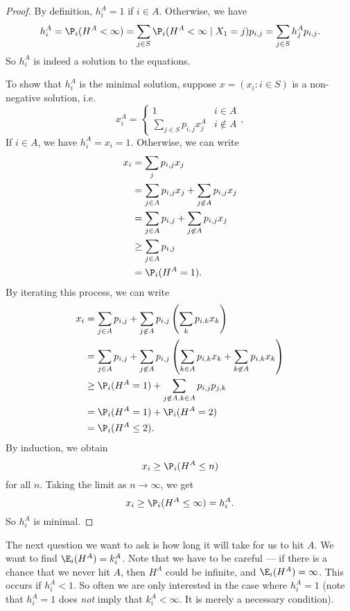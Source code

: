 \documentclass[a4paper]{article}
\begin{document}
\begin{proof}
  By definition, $h_i^A = 1$ if $i \in A$. Otherwise, we have
  \[
    h_i^A = \P_i(H^A < \infty) = \sum_{j\in S} \P_i(H^A < \infty \mid X_1 = j)p_{i, j} = \sum_{j\in S}h_{j}^A p_{i, j}.
  \]
  So $h_i^A$ is indeed a solution to the equations.

  To show that $h_i^A$ is the minimal solution, suppose $x = (x_i: i \in S)$ is a non-negative solution, i.e.
  \[
    x_i^A =
    \begin{cases}
      1 & i \in A\\
      \sum_{j \in S}p_{i, j}x_j^A & i \not \in A
    \end{cases},
  \]
  If $i \in A$, we have $h_i^A = x_i = 1$. Otherwise, we can write
  \begin{align*}
    x_i &= \sum_j p_{i, j}x_j \\
    &= \sum_{j \in A}p_{i, j}x_j + \sum_{j \not\in A}p_{i, j}x_j \\
    &= \sum_{j \in A}p_{i, j} + \sum_{j \not\in A}p_{i, j}x_j \\
    &\geq \sum_{j \in A}p_{i, j}\\
    &= \P_i(H^A = 1).
  \end{align*}
  By iterating this process, we can write
  \begin{align*}
    x_i &= \sum_{j \in A} p_{i, j} + \sum_{j \not\in A} p_{i, j}\left(\sum_k p_{i, k} x_k\right) \\
    &= \sum_{j \in A} p_{i, j} + \sum_{j \not\in A} p_{i, j}\left(\sum_{k\in A} p_{i, k} x_k + \sum_{k \not\in A} p_{i, k}x_k\right)\\
    &\geq \P_i (H^A = 1) + \sum_{j \not \in A, k \in A}p_{i, j}p_{j, k}\\
    &= \P_i(H^A = 1) + \P_i(H^A = 2)\\
    &= \P_i (H^A \leq 2).
  \end{align*}
  By induction, we obtain
  \[
    x_i \geq \P_i(H^A \leq n)
  \]
  for all $n$. Taking the limit as $n \to \infty$, we get
  \[
    x_i \geq \P_i(H^A \leq \infty) = h_i^A.
  \]
  So $h_i^A$ is minimal.
\end{proof}
The next question we want to ask is how long it will take for us to hit $A$. We want to find $\E_i(H^A) = k_i^A$. Note that we have to be careful --- if there is a chance that we never hit $A$, then $H^A$ could be infinite, and $\E_i(H^A) = \infty$. This occurs if $h_i^A < 1$. So often we are only interested in the case where $h_i^A = 1$ (note that $h_i^A = 1$ does \emph{not} imply that $k_i^A < \infty$. It is merely a necessary condition).
\end{document}

